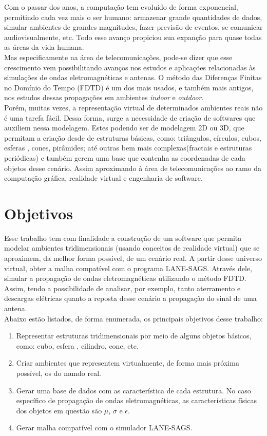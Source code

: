 Com o passar dos anos, a computação tem evoluído de forma exponencial\cite{comp_history}, permitindo cada vez mais o ser humano: armazenar grande quantidades de dados, simular ambientes de grandes magnitudes, fazer previsão de eventos, se comunicar audiovisualmente, etc. Todo esse avanço propiciou sua expanção para quase todas as áreas da vida humana.\\

Mas especificamente na área de telecomunicações, pode-se dizer que esse crescimento vem possibilitando avanços nos estudos e aplicações relacionadas às simulações de ondas eletromagnéticas e antenas. O método das Diferenças Finitas no Domínio do Tempo (FDTD)\cite{fdtd_intro} é um dos mais usados, e também mais antigos, nos estudos dessas propagações em ambientes \textit{indoor} e \textit{outdoor}\cite{rodrigo_intro}.\\

Porém, muitas vezes, a representação virtual de determinados ambientes reais não é uma tarefa fácil. Dessa forma, surge a necessidade de criação de softwares que auxiliem nessa modelagem. Estes podendo ser de modelagem 2D ou 3D, que permitam a criação desde de estruturas básicas, como: triângulos, círculos, cubos, esferas , cones, pirâmides; até outras bem mais complexas(fractais e estruturas periódicas) e também gerem uma base que contenha as coordenadas de cada objetos desse cenário. Assim aproximando à área de telecomunicações ao ramo da computação gráfica, realidade virtual e engenharia de software.

\section{Objetivos}
Esse trabalho tem com finalidade a construção de um software que permita modelar ambientes tridimensionais (usando conceitos de realidade virtual) que se aproximem, da melhor forma possível, de um cenário real. A partir desse universo virtual, obter a malha compatível com o programa LANE-SAGS. Através dele, simular a propagação de ondas eletromagnéticas utilizando o método FDTD. Assim, tendo a possibilidade de analisar, por exemplo, tanto aterramento e descargas elétricas quanto a reposta desse cenário a propagação do sinal de uma antena.\\

Abaixo estão listados, de forma enumerada, os principais objetivos desse trabalho:
\begin{enumerate}
\item {Representar estruturas tridimensionais por meio de alguns objetos básicos, como: cubo, esfera , cilindro, cone, etc.}
\item {Criar ambientes que representem virtualmente, de forma mais próxima possível, os do mundo real. }
\item {Gerar uma base de dados com as característica de cada estrutura. No caso específico de propagação de ondas eletromagnéticas, as características físicas dos objetos em questão são $\mu$, $\sigma$ e $\epsilon$.}
\item {Gerar malha compatível com o simulador LANE-SAGS.}
\end{enumerate}

